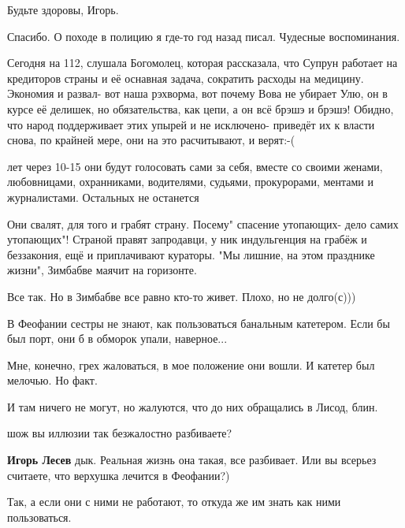\begin{itemize}
Будьте здоровы, Игорь.

\begin{itemize} %
Спасибо. О походе в полицию я где-то год назад писал. Чудесные воспоминания.
\end{itemize} %


Сегодня на 112, слушала Богомолец, которая рассказала, что Супрун работает на
кредиторов страны и её оснавная задача, сократить расходы на медицину. Экономия
и развал- вот наша рэхворма, вот почему Вова не убирает Улю, он в курсе её
делишек, но обязательства, как цепи, а он всё брэшэ и брэшэ! Обидно, что народ
поддерживает этих упырей и не исключено- приведёт их к власти снова, по крайней
мере, они на это расчитывают, и верят:-(

\begin{itemize} %

лет через 10-15 они будут голосовать сами за себя, вместе со своими женами,
любовницами, охранниками, водителями, судьями, прокурорами, ментами и
журналистами. Остальных не останется



Они свалят, для того и грабят страну. Посему" спасение утопающих- дело самих
утопающих"! Страной правят запродавци, у ник индульгенция на грабёж и
беззакония, ещё и приплачивают кураторы. "Мы лишние, на этом празднике жизни",
Зимбабве маячит на горизонте.

Все так. Но в Зимбабве все равно кто-то живет. Плохо, но не долго(с)))
\end{itemize} %


В Феофании сестры не знают, как пользоваться банальным катетером. Если бы был
порт, они б в обморок упали, наверное...

Мне, конечно, грех жаловаться, в мое положение они вошли. И катетер был
мелочью. Но факт.

И там ничего не могут, но жалуются, что до них обращались в Лисод, блин.

\begin{itemize} %
шож вы иллюзии так безжалостно разбиваете?

\textbf{Игорь Лесев} дык. Реальная жизнь она такая, все разбивает.
Или вы всерьез считаете, что верхушка лечится в Феофании?)

Так, а если они с ними не работают, то откуда же им знать как ними пользоваться.


\end{itemize}
\end{itemize}
